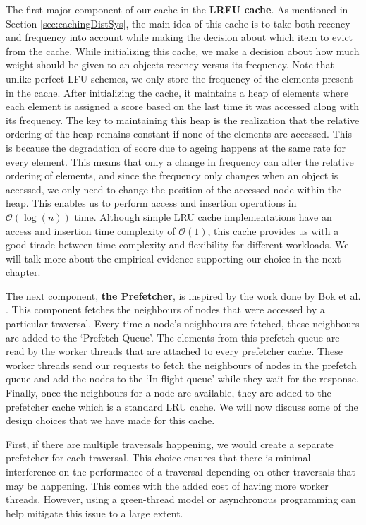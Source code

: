 \medskip
The first major component of our cache in the \textbf{LRFU
cache}\cite{lee2001lrfu}. As mentioned in Section \ref{sec:cachingDistSys}, the
main idea of this cache is to take both recency and frequency into account while
making the decision about which item to evict from the cache. While initializing
this cache, we make a decision about how much weight should be given to an
objects recency versus its frequency. Note that unlike perfect-LFU schemes, we
only store the frequency of the elements present in the cache. After
initializing the cache, it maintains a heap of elements where each element is
assigned a score based on the last time it was accessed along with its
frequency. The key to maintaining this heap is the realization that the relative
ordering of the heap remains constant if none of the elements are accessed. This
is because the degradation of score due to ageing happens at the same
rate for every element. This means that only a change in frequency can alter
the relative ordering of elements, and since the frequency only changes when an
object is accessed, we only need to change the position of the accessed node
within the heap. This enables us to perform access and insertion operations in
$\mathcal{O}(\log(n))$ time. Although simple LRU cache implementations have an
access and insertion time complexity of $\mathcal{O}(1)$,  this cache provides 
us with a good tirade between time complexity and flexibility for 
different workloads. We will talk more about the empirical evidence supporting
our choice in the next chapter.

\medskip
The next component, \textbf{the Prefetcher}, is inspired by the work done
by Bok et al. \cite{bok2020memory}. This component fetches the neighbours of
nodes that were accessed by a particular traversal. Every time a node's
neighbours are fetched, these neighbours are added to the `Prefetch Queue'. The
elements from this prefetch queue are read by the worker threads that are
attached to every prefetcher cache. These worker threads send our requests to
fetch the neighbours of nodes in the prefetch queue and add the nodes to the
`In-flight queue' while they wait for the response. Finally, once the neighbours
for a node are available, they are added to the prefetcher cache which is a
standard LRU cache. We will now discuss some of the design choices that we have
made for this cache.

\medskip
First, if there are multiple traversals happening, we would create a separate
prefetcher for each traversal. This choice ensures that there is minimal
interference on the performance of a traversal depending on other traversals
that may be happening. This comes with the added cost of having more worker
threads. However, using a green-thread model or asynchronous programming can help
mitigate this issue to a large extent. 

